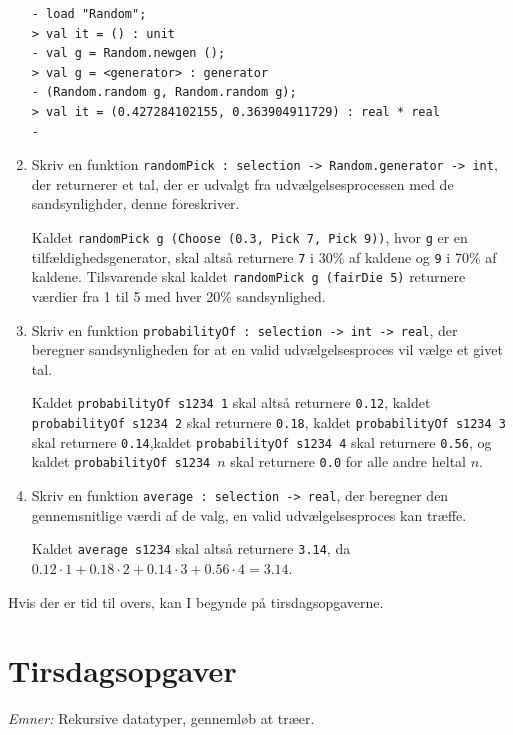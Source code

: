 \documentclass[a4paper,12pt]{article}
\begin{document}
\begin{enumerate}[{5}M1]
\begin{lstlisting}
- load "Random";
> val it = () : unit
- val g = Random.newgen ();
> val g = <generator> : generator
- (Random.random g, Random.random g);
> val it = (0.427284102155, 0.363904911729) : real * real
-
\end{lstlisting}


\item Skriv en funktion
  \lstinline{randomPick : selection -> Random.generator -> int},
  der returnerer et tal, der er udvalgt fra udvælgelsesprocessen med
  de sandsynlighder, denne foreskriver.

  Kaldet 
  \lstinline{randomPick g (Choose (0.3, Pick 7, Pick 9))},
  hvor \lstinline{g} er en tilfældighedsgenerator, skal altså
  returnere \lstinline{7} i 30\% af kaldene og \lstinline{9} i 70\%
  af kaldene.  Tilsvarende skal kaldet
  \lstinline{randomPick g (fairDie 5)} returnere værdier fra 1 til 5
  med hver 20\% sandsynlighed.

\item Skriv en funktion
  \lstinline{probabilityOf : selection -> int -> real}, der beregner
  sandsynligheden for at en valid udvælgelsesproces vil vælge et givet
  tal.

  Kaldet
  \lstinline{probabilityOf s1234 1}
  skal altså returnere \lstinline{0.12}, kaldet
  \lstinline{probabilityOf s1234 2}
  skal returnere \lstinline{0.18}, kaldet
  \lstinline{probabilityOf s1234 3}
  skal returnere \lstinline{0.14},\newline kaldet
  \lstinline{probabilityOf s1234 4}
  skal returnere \lstinline{0.56}, og kaldet
  \lstinline{probabilityOf s1234}~$n$
  skal returnere  \lstinline{0.0} for alle andre heltal $n$.

\item Skriv en funktion \lstinline{average : selection -> real}, der
  beregner den gennemsnitlige værdi af de valg, en valid udvælgelsesproces
  kan træffe.

Kaldet \lstinline{average s1234} skal altså returnere \lstinline{3.14},
da $0.12\cdot 1 + 0.18\cdot 2 + 0.14\cdot 3 + 0.56\cdot 4 = 3.14$.

\end{enumerate}

Hvis der er tid til overs, kan I begynde på tirsdagsopgaverne.

\section{Tirsdagsopgaver}
\label{sec:tirsdagsopgaver}
\textit{Emner:} Rekursive datatyper, gennemløb at træer.
\end{document}
